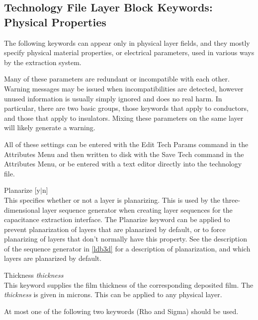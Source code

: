 \subsection{Technology File Layer Block Keywords:  Physical Properties}
\label{phkwords}

The following keywords can appear only in physical layer fields, and
they mostly specify physical material properties, or electrical
parameters, used in various ways by the extraction system.

Many of these parameters are redundant or incompatible with each
other.  Warning messages may be issued when incompatibilities are
detected, however unused information is usually simply ignored and
does no real harm.  In particular, there are two basic groups, those
keywords that apply to conductors, and those that apply to insulators. 
Mixing these parameters on the same layer will likely generate a
warning.

All of these settings can be entered with the {\cb Edit Tech Params}
command in the {\cb Attributes Menu} and then written to disk with the
{\cb Save Tech} command in the {\cb Attributes Menu}, or be entered
with a text editor directly into the technology file.

\begin{description}
\item{\et Planarize} [{\vt y}$|${\vt n}]\\
This specifies whether or not a layer is planarizing.  This is used by
the three-dimensional layer sequence generator when creating layer
sequences for the capacitance extraction interface.  The {\vt
Planarize} keyword can be applied to prevent planarization of layers
that are planarized by default, or to force planarizing of layers that
don't normally have this property.  See the description of the
sequence generator in \ref{ldb3d} for a description of planarization,
and which layers are planarized by default.

\item{\et Thickness {\it thickness}}\\
This keyword supplies the film thickness of the corresponding
deposited film.  The {\it thickness} is given in microns.  This can be
applied to any physical layer.
\end{description}

At most one of the following two keywords ({\et Rho} and {\et Sigma})
should be used.


